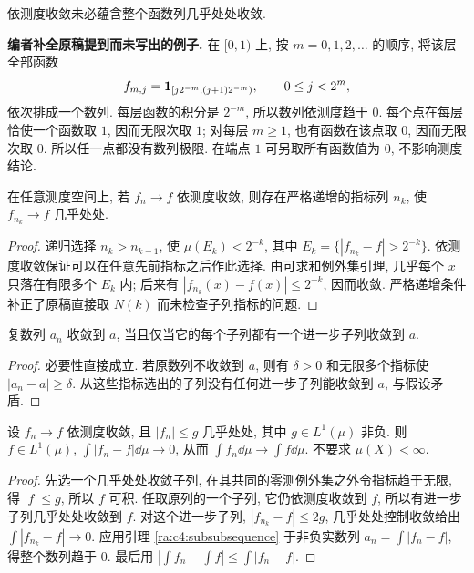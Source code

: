 \begin{example}\label{ra:c4:typewriter}
依测度收敛未必蕴含整个函数列几乎处处收敛.
\end{example}
\begin{solution}
\textbf{编者补全原稿提到而未写出的例子.} 在 $[0,1)$ 上, 按 $m=0,1,2,\ldots$ 的顺序, 将该层全部函数
\[
 f_{m,j}=\mathbf 1_{[j2^{-m},(j+1)2^{-m})},\qquad 0\le j<2^m,
\]
依次排成一个数列. 每层函数的积分是 $2^{-m}$, 所以数列依测度趋于 $0$. 每个点在每层恰使一个函数取 $1$, 因而无限次取 $1$; 对每层 $m\ge1$, 也有函数在该点取 $0$, 因而无限次取 $0$. 所以任一点都没有数列极限. 在端点 $1$ 可另取所有函数值为 $0$, 不影响测度结论.
\end{solution}

\begin{theorem}\label{ra:c4:subsequence}
在任意测度空间上, 若 $f_n\to f$ 依测度收敛, 则存在严格递增的指标列 $n_k$, 使 $f_{n_k}\to f$ 几乎处处.
\end{theorem}
\begin{proof}
递归选择 $n_k>n_{k-1}$, 使 $\mu(E_k)<2^{-k}$, 其中 $E_k=\{|f_{n_k}-f|>2^{-k}\}$. 依测度收敛保证可以在任意先前指标之后作此选择. 由可求和例外集引理, 几乎每个 $x$ 只落在有限多个 $E_k$ 内; 后来有 $|f_{n_k}(x)-f(x)|\le2^{-k}$, 因而收敛. 严格递增条件补正了原稿直接取 $N(k)$ 而未检查子列指标的问题.
\end{proof}

\begin{lemma}\label{ra:c4:subsubsequence}
复数列 $a_n$ 收敛到 $a$, 当且仅当它的每个子列都有一个进一步子列收敛到 $a$.
\end{lemma}
\begin{proof}
必要性直接成立. 若原数列不收敛到 $a$, 则有 $\delta>0$ 和无限多个指标使 $|a_n-a|\ge\delta$. 从这些指标选出的子列没有任何进一步子列能收敛到 $a$, 与假设矛盾.
\end{proof}

\begin{theorem}[依测度的控制收敛]\label{ra:c4:measuredct}
设 $f_n\to f$ 依测度收敛, 且 $|f_n|\le g$ 几乎处处, 其中 $g\in L^1(\mu)$ 非负. 则 $f\in L^1(\mu)$, $\int|f_n-f|\dd\mu\to0$, 从而 $\int f_n\dd\mu\to\int f\dd\mu$. 不要求 $\mu(X)<\infty$.
\end{theorem}
\begin{proof}
先选一个几乎处处收敛子列, 在其共同的零测例外集之外令指标趋于无限, 得 $|f|\le g$, 所以 $f$ 可积. 任取原列的一个子列, 它仍依测度收敛到 $f$, 所以有进一步子列几乎处处收敛到 $f$. 对这个进一步子列, $|f_{n_k}-f|\le2g$, 几乎处处控制收敛给出 $\int|f_{n_k}-f|\to0$. 应用引理 \ref{ra:c4:subsubsequence} 于非负实数列 $a_n=\int|f_n-f|$, 得整个数列趋于 $0$. 最后用 $|\int f_n-\int f|\le\int|f_n-f|$.
\end{proof}

